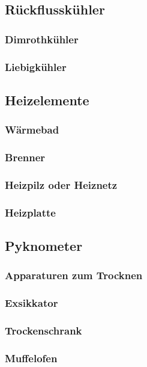 \subsection{Rückflusskühler}
\subsubsection{Dimrothkühler}
\subsubsection{Liebigkühler}

\subsection{Heizelemente}
\subsubsection{Wärmebad}
\subsubsection{Brenner}
\subsubsection{Heizpilz oder Heiznetz}
\subsubsection{Heizplatte}

\subsection{Pyknometer}

\subsubsection{Apparaturen zum Trocknen}
\subsubsection{Exsikkator}
\subsubsection{Trockenschrank}
\subsubsection{Muffelofen}

